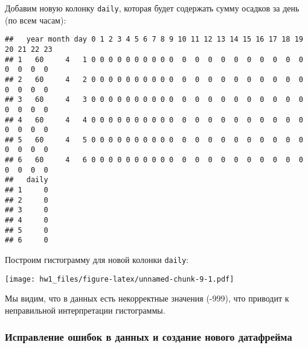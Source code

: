 \documentclass[
]{article}
\newenvironment{Shaded}{\begin{snugshade}}{\end{snugshade}}
\newcommand{\AttributeTok}[1]{\textcolor[rgb]{0.13,0.29,0.53}{#1}}
\newcommand{\DecValTok}[1]{\textcolor[rgb]{0.00,0.00,0.81}{#1}}
\newcommand{\FunctionTok}[1]{\textcolor[rgb]{0.13,0.29,0.53}{\textbf{#1}}}
\newcommand{\NormalTok}[1]{#1}
\newcommand{\OtherTok}[1]{\textcolor[rgb]{0.56,0.35,0.01}{#1}}
\newcommand{\SpecialCharTok}[1]{\textcolor[rgb]{0.81,0.36,0.00}{\textbf{#1}}}
\newcommand{\StringTok}[1]{\textcolor[rgb]{0.31,0.60,0.02}{#1}}
\begin{document}
Добавим новую колонку \texttt{daily}, которая будет содержать сумму
осадков за день (по всем часам):

\begin{Shaded}
\end{Shaded}

\begin{verbatim}
##   year month day 0 1 2 3 4 5 6 7 8 9 10 11 12 13 14 15 16 17 18 19 20 21 22 23
## 1   60     4   1 0 0 0 0 0 0 0 0 0 0  0  0  0  0  0  0  0  0  0  0  0  0  0  0
## 2   60     4   2 0 0 0 0 0 0 0 0 0 0  0  0  0  0  0  0  0  0  0  0  0  0  0  0
## 3   60     4   3 0 0 0 0 0 0 0 0 0 0  0  0  0  0  0  0  0  0  0  0  0  0  0  0
## 4   60     4   4 0 0 0 0 0 0 0 0 0 0  0  0  0  0  0  0  0  0  0  0  0  0  0  0
## 5   60     4   5 0 0 0 0 0 0 0 0 0 0  0  0  0  0  0  0  0  0  0  0  0  0  0  0
## 6   60     4   6 0 0 0 0 0 0 0 0 0 0  0  0  0  0  0  0  0  0  0  0  0  0  0  0
##   daily
## 1     0
## 2     0
## 3     0
## 4     0
## 5     0
## 6     0
\end{verbatim}

Построим гистограмму для новой колонки \texttt{daily}:

\begin{Shaded}
\end{Shaded}

\texttt{[image: hw1\_files/figure-latex/unnamed-chunk-9-1.pdf]}

Мы видим, что в данных есть некорректные значения (-999), что приводит к
неправильной интерпретации гистограммы.

\subsubsection{Исправление ошибок в данных и создание нового
датафрейма}\label{ux438ux441ux43fux440ux430ux432ux43bux435ux43dux438ux435-ux43eux448ux438ux431ux43eux43a-ux432-ux434ux430ux43dux43dux44bux445-ux438-ux441ux43eux437ux434ux430ux43dux438ux435-ux43dux43eux432ux43eux433ux43e-ux434ux430ux442ux430ux444ux440ux435ux439ux43cux430}
\end{document}
